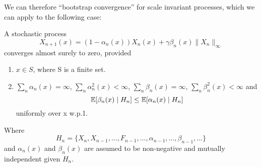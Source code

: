 We can therefore ``bootstrap convergence'' for scale invariant processes, which we can apply to the following case:

\begin{lemma}\label{norm lemma}
    A stochastic process
    \[
        X_{n+1}(x)=(1-\alpha_n(x))X_n(x)+\gamma\beta_n(x)\|X_n\|_\infty
    \]
    converges almost surely to zero, provided
    \begin{enumerate}
        \item \(x\in S\), where S is a finite set.
        \item \(\sum_n \alpha_n(x)=\infty\), \(\sum_n \alpha_n^2(x) <\infty\), \(\sum_n\beta_n(x)=\infty\), \(\sum_n \beta_n^2 (x)<\infty\) and
        \[
            \mathbb{E}[\beta_n(x)\mid H_n]\le \mathbb{E}[\alpha_n(x)\mid H_n]
        \]
        uniformly over x w.p.1.
    \end{enumerate}
    Where 
    \[
        H_n=\{X_n, X_{n-1}, \dots, F_{n-1}, \dots, \alpha_{n-1},\dots, \beta_{n-1},\dots\}
    \]
    and \(\alpha_n(x)\) and \(\beta_n(x)\) are assumed to be non-negative and mutually independent given \(H_n\).
\end{lemma}

